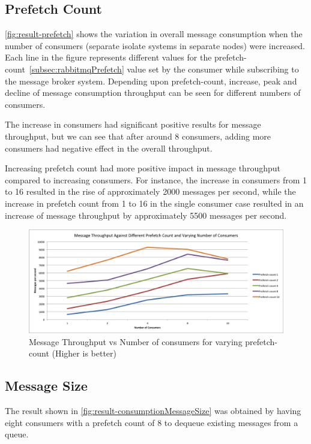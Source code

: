 \subsection{Prefetch Count}
\label{subsec:prefetchCount}
\autoref{fig:result-prefetch} shows the variation in overall message consumption when the number of consumers (separate isolate systems in separate nodes) were increased. Each line in the figure represents different values for the prefetch-count~\autoref{subsec:rabbitmqPrefetch} value set by the consumer while subscribing to the message broker system. Depending upon prefetch-count, increase, peak and decline of message consumption throughput can be seen for different numbers of consumers.

  The increase in consumers had significant positive results for message throughput, but we can see that after around 8 consumers, adding more consumers had negative effect in the overall throughput.

    Increasing prefetch count had more positive impact in message throughput compared to increasing consumers. For instance, the increase in consumers from 1 to 16 resulted in the rise of approximately 2000 messages per second, while the increase in prefetch count from 1 to 16 in the single consumer case resulted in an increase of message throughput by approximately 5500 messages per second.

\begin{figure}[H]
  \centering
  \includegraphics[width=1\textwidth]{figures/01prefetch}
  \caption[Message Throughput vs Number of consumers for varying prefetch-count]{Message Throughput vs Number of consumers for varying prefetch-count (Higher is better)}
  \label{fig:result-prefetch}
\end{figure}

\subsection{Message Size}
\label{subsec:messageSize}
The result shown in \autoref{fig:result-consumptionMessageSize} was obtained by having eight consumers with a prefetch count of 8 to dequeue existing messages from a queue.

